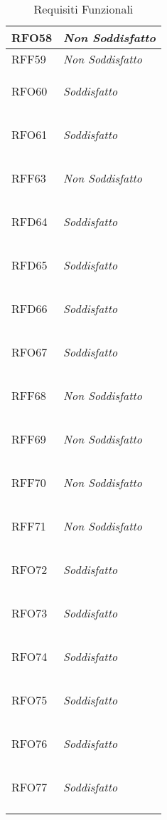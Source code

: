 \begin{longtable}{|>{\centering}m{5cm}|m{5cm}<{\centering}|}
    \hypertarget{RFO58}{RFO58} & \textit{Non Soddisfatto}\\ \hline
   
    \hypertarget{RFF59}{RFF59} & \textit{Non Soddisfatto}\\ \hline
   
    \hypertarget{RFO60}{RFO60} & \textit{Soddisfatto}\\ \hline
   
    \hypertarget{RFO61}{RFO61} & \textit{Soddisfatto}\\ \hline
   
    \hypertarget{RFF63}{RFF63} & \textit{Non Soddisfatto}\\ \hline
   
    \hypertarget{RFD64}{RFD64} & \textit{Soddisfatto}\\ \hline
   
    \hypertarget{RFD65}{RFD65} & \textit{Soddisfatto}\\ \hline
   
    \hypertarget{RFD66}{RFD66} & \textit{Soddisfatto}\\ \hline
   
    \hypertarget{RFO67}{RFO67} & \textit{Soddisfatto}\\ \hline
   
    \hypertarget{RFF68}{RFF68} & \textit{Non Soddisfatto}\\ \hline
   
    \hypertarget{RFF69}{RFF69} & \textit{Non Soddisfatto}\\ \hline
   
    \hypertarget{RFF70}{RFF70} & \textit{Non Soddisfatto}\\ \hline
   
    \hypertarget{RFF71}{RFF71} & \textit{Non Soddisfatto}\\ \hline
   
    \hypertarget{RFO72}{RFO72} & \textit{Soddisfatto}\\ \hline
   
    \hypertarget{RFO73}{RFO73} & \textit{Soddisfatto}\\ \hline
   
    \hypertarget{RFO74}{RFO74} & \textit{Soddisfatto}\\ \hline
   
    \hypertarget{RFO75}{RFO75} & \textit{Soddisfatto}\\ \hline
   
    \hypertarget{RFO76}{RFO76} & \textit{Soddisfatto}\\ \hline
   
    \hypertarget{RFO77}{RFO77} & \textit{Soddisfatto}\\ \hline
   
    \caption[Requisiti Funzionali]{Requisiti Funzionali}
    \label{tabella:req0}
\end{longtable}
\clearpage
